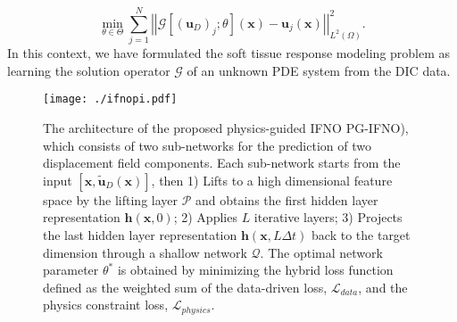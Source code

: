 \documentclass[twocolumn,10pt]{asme2ej}
\renewcommand{\~}{\tilde}
\renewcommand{\-}{\bar}
\newcommand{\8}{\infty}
\numberwithin{equation}{section}
\newcommand{\real}{\mathbb{R}}
\newcommand{\mcK}{\mathcal{K}}
\newcommand{\mcG}{\mathcal{G}}
\newcommand{\mcF}{\mathcal{F}}
\newcommand{\mcN}{\mathcal{N}}
\def\omg{{\Omega}}
\def \bb{\bm{b}}
\def \fb{\bm{f}}
\def \ub{\bm{u}}
\def \xb{\bm{x}}
\def \hb{\bm{h}}
\newcommand{\vertii}[1]{{\left\vert\left\vert #1
    \right\vert\right\vert}}
\begin{document}
\begin{equation}\label{eqn:opt}
\min_{\theta\in\Theta}\sum_{j=1}^N\vertii{\mcG[(\ub_D)_j;\theta](\xb)-\ub_j(\xb)}_{L^2(\omg)}^2.
\end{equation}
%
In this context, we have formulated the soft tissue response modeling problem as learning the solution operator $\mcG$ of an unknown PDE system from the DIC data. 


\begin{figure*}[!ht]
	\centering
	\texttt{[image: ./ifnopi.pdf]}
	\caption{The architecture of the proposed physics-guided IFNO PG-IFNO), which consists of two sub-networks for the prediction of two displacement field components. Each sub-network starts from the input $[\xb,\tilde{\ub}_D(\xb)]$, then 1) Lifts to a high dimensional feature space by the lifting layer $\mathcal{P}$ and obtains the first hidden layer representation $\hb(\xb,0)$; 2) Applies $L$ iterative layers; 3) Projects the last hidden layer representation $\hb(\xb,L\Delta t)$ back to the target dimension through a shallow network $\mathcal{Q}$. The optimal network parameter $\theta^*$ is obtained by minimizing the hybrid loss function defined as the weighted sum of the data-driven loss, $\mathcal{L}_{data}$, and the physics constraint loss, $\mathcal{L}_{physics}$.}
\label{fig:domain}
\end{figure*}
\end{document}
